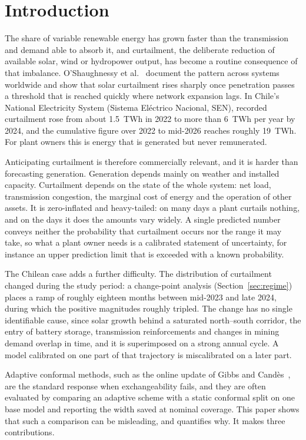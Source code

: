 \section{Introduction}
\label{sec:intro}

The share of variable renewable energy has grown faster than the transmission and demand able to absorb it, and curtailment, the deliberate reduction of available solar, wind or hydropower output, has become a routine consequence of that imbalance. O'Shaughnessy et al.~\cite{oshaughnessy2020} document the pattern across systems worldwide and show that solar curtailment rises sharply once penetration passes a threshold that is reached quickly where network expansion lags. In Chile's National Electricity System (Sistema El\'ectrico Nacional, SEN), recorded curtailment rose from about 1.5~TWh in 2022 to more than 6~TWh per year by 2024, and the cumulative figure over 2022 to mid-2026 reaches roughly 19~TWh. For plant owners this is energy that is generated but never remunerated.

Anticipating curtailment is therefore commercially relevant, and it is harder than forecasting generation. Generation depends mainly on weather and installed capacity. Curtailment depends on the state of the whole system: net load, transmission congestion, the marginal cost of energy and the operation of other assets. It is zero-inflated and heavy-tailed: on many days a plant curtails nothing, and on the days it does the amounts vary widely. A single predicted number conveys neither the probability that curtailment occurs nor the range it may take, so what a plant owner needs is a calibrated statement of uncertainty, for instance an upper prediction limit that is exceeded with a known probability.

The Chilean case adds a further difficulty. The distribution of curtailment changed during the study period: a change-point analysis (Section~\ref{sec:regime}) places a ramp of roughly eighteen months between mid-2023 and late 2024, during which the positive magnitudes roughly tripled. The change has no single identifiable cause, since solar growth behind a saturated north--south corridor, the entry of battery storage, transmission reinforcements and changes in mining demand overlap in time, and it is superimposed on a strong annual cycle. A model calibrated on one part of that trajectory is miscalibrated on a later part.

Adaptive conformal methods, such as the online update of Gibbs and Cand\`es~\cite{gibbs2021}, are the standard response when exchangeability fails, and they are often evaluated by comparing an adaptive scheme with a static conformal split on one base model and reporting the width saved at nominal coverage. This paper shows that such a comparison can be misleading, and quantifies why. It makes three contributions.

